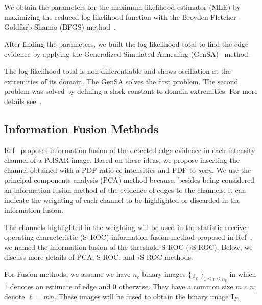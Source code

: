 \documentclass[remotesensing,article,submit,pdftex,moreauthors]{Definitions/mdpi}
\begin{document}
We obtain the parameters for the maximum likelihood estimator (MLE) by maximizing the reduced log-likelihood function with the Broyden-Fletcher-Goldfarb-Shanno (BFGS) method~\cite{ht}.

After finding the parameters, we built the log-likelihood total to find the edge evidence by applying the Generalized Simulated Annealing (GenSA)~\cite{xgsh} method. 

The log-likelihood total is non-differentiable and shows oscillation at the extremities of its domain. The GenSA solves the first problem. The second problem was solved by defining a slack constant to domain extremities. For more details see~\citet{FusionofEvidencesinIntensitiesChannelsforEdgeDetectioninPolSARImages}.
%
\subsection{Information Fusion Methods}
Ref~\cite{FusionofEvidencesinIntensitiesChannelsforEdgeDetectioninPolSARImages} proposes information fusion of the detected edge evidence in each intensity channel of a PolSAR image. Based on these ideas, we propose inserting the channel obtained with a PDF ratio of intensities and PDF to \textit{span}. We use the principal components analysis (PCA) method because, besides being considered an information fusion method of the evidence of edges to the channels, it can indicate the weighting of each channel to be highlighted or discarded in the information fusion.

The channels highlighted in the weighting will be used in the statistic receiver operating characteristic (S--ROC) information fusion method proposed in Ref~\cite{gs}, we named the information fusion of the threshold S-ROC ($\tau$S-ROC). Below, we discuss more details of PCA, S-ROC, and $\tau$S-ROC methods.

For Fusion methods, we assume we have $n_c$ binary images $\{\widehat{\bm\jmath}_c\}_{1\leq c\leq n_c}$ in which~$1$ denotes an estimate of edge and $0$ otherwise.
They have a common size $m\times n$; denote $\ell=mn$.
These images will be fused to obtain the binary image $\bm I_F$.
%
\end{document}

